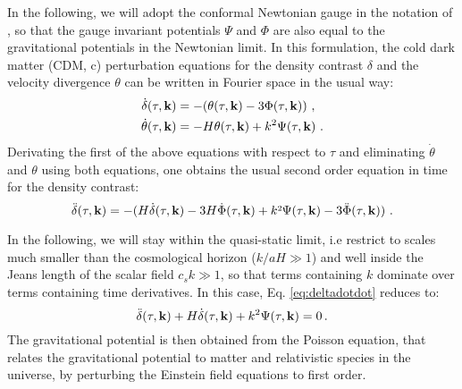 In the following, we will adopt the conformal Newtonian gauge in the
notation of \citep{MaBertschinger}, so that the gauge invariant potentials
$\Psi$ and $\Phi$ are also equal to the gravitational potentials
in the Newtonian limit. In this formulation, the cold dark matter
(CDM, c) perturbation equations for the density contrast $\delta$
and the velocity divergence $\theta$ can be written in Fourier space
in the usual way: 
\begin{align}
\dot{\delta}(\tau,\mathbf{k}) & =-(\theta(\tau,\mathbf{k})-3\Phi(\tau,\mathbf{k}))\,\,,\\
\dot{\theta}(\tau,\mathbf{k}) & =-H\theta(\tau,\mathbf{k})+k^{2}\Psi(\tau,\mathbf{k})\,\,.
\end{align}
Derivating the first of the above equations with respect to $\tau$
and eliminating $\dot{\theta}$ and $\theta$ using both equations,
one obtains the usual second order equation in time for the density
contrast: 
\begin{equation}
\ddot{\delta}(\tau,\vk k)=-(H\dot{\delta}(\tau,\vk k)-3H\dot{\Phi}(\tau,\vk k)+k\text{\texttwosuperior}\Psi(\tau,\vk k)-3\ddot{\Phi}(\tau,\vk k))\,\,.\label{eq:deltadotdot}
\end{equation}

In the following, we will stay within the quasi-static
limit, i.e restrict to scales much smaller than the cosmological horizon
($k/aH\gg1$) and well inside the Jeans length of the scalar field
$c_{s}k\gg1$, so that terms containing $k$ dominate over terms containing
time derivatives. In this case, Eq. \ref{eq:deltadotdot} reduces
to: 
\begin{equation}
\ddot{\delta}(\tau,\mathbf{k})+H\dot{\delta}(\tau,\mathbf{k})+k^{2}\Psi(\tau,\mathbf{k})=0\,.\label{eq:growth-rate-Psi}
\end{equation}
The gravitational potential is then obtained from the Poisson equation,
that relates the gravitational potential to matter and relativistic
species in the universe, by perturbing the Einstein field equations
to first order.

